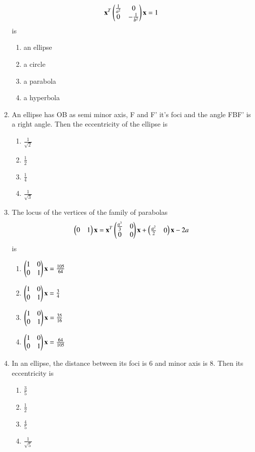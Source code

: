 \begin{enumerate}[label=\arabic*.,ref=\thesubsection.\theenumi]
    \begin{align}
    \mathbf{x}^T\begin{pmatrix}\frac{1}{a^2}&0\\0&-\frac{1}{b^2}\end{pmatrix}\mathbf{x}=1
    \end{align} is 
    \begin{enumerate}
    \item an ellipse
    \item a circle 
    \item a parabola
    \item a hyperbola 
    \end{enumerate}
    \item An ellipse has OB as semi minor axis, F and F' it's foci and the angle FBF' is a right angle. Then the eccentricity of the ellipse is
    \begin{enumerate}
    \item $\frac{1}{\sqrt{2}}$
    \item $\frac{1}{2}$ 
    \item $\frac{1}{4}$
    \item $\frac{1}{\sqrt{3}}$ 
    \end{enumerate}
    \item The locus of the vertices of the family of parabolas
    \begin{align}
    \begin{pmatrix}0&1\end{pmatrix}\mathbf{x}=\mathbf{x}^T\begin{pmatrix}\frac{a^3}{3}&0\\0&0\end{pmatrix} \mathbf{x}+\begin{pmatrix}\frac{a^2}{2}&0\end{pmatrix} \mathbf{x}-2a
    \end{align} is
    \begin{enumerate}
    \item $\begin{pmatrix}1&0\\0&1\end{pmatrix}\mathbf{x}=\frac{105}{64}$
    \item $\begin{pmatrix}1&0\\0&1\end{pmatrix}\mathbf{x}=\frac{3}{4}$
    \item $\begin{pmatrix}1&0\\0&1\end{pmatrix}\mathbf{x}=\frac{35}{16}$
    \item $\begin{pmatrix}1&0\\0&1\end{pmatrix}\mathbf{x}=\frac{64}{105}$ 
    \end{enumerate}
    \item In an ellipse, the distance between its foci is 6 and minor axis is 8. Then its eccentricity is
    \begin{enumerate}
    \item $\frac{3}{5}$
    \item $\frac{1}{2}$ 
    \item $\frac{4}{5}$
    \item $\frac{1}{\sqrt{5}}$ 

\end{enumerate}
\end{enumerate}

